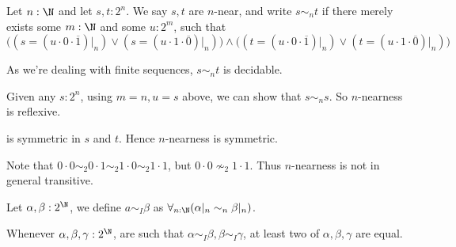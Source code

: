 \begin{definition}
  Let $n:\N$ and let $s,t : 2^n$. 
  We say $s,t$ are $n$-near, and write $s\sim_n t$ if 
  there merely exists some $m:\N$ and some $u:2^m$, such that 
 \begin{equation}\label{EqnNearness}
   \big(
     (s = (u\cdot 0\cdot \overline 1)|_n) \vee (s = (u \cdot 1 \cdot \overline 0) |_n)
   \big)
    \wedge 
   \big(
     (t = (u\cdot 0\cdot \overline 1)|_n) \vee (t = (u \cdot 1 \cdot \overline 0) |_n)
   \big)
  \end{equation} 
\end{definition}
\begin{remark}\label{nearnessProperties}
\item As we're dealing with finite sequences, $s\sim_n t$ is decidable. 
\item Given any $s:2^n$, using $m=n, u = s$ above, we can show that $s\sim_n s$. 
  So $n$-nearness is reflexive. 
\item {} is symmetric in $s$ and $t$. Hence $n$-nearness is symmetric.
\item Note that $0\cdot 0\sim_2 0\cdot 1 \sim_2 1\cdot 0 \sim_2 1\cdot 1$, 
  but $0\cdot 0\nsim_2 1\cdot 1$. %
  Thus $n$-nearness is not in general transitive. 
\end{remark}
\begin{definition}
  Let $\alpha, \beta: 2^\N$, we define $a\sim_I\beta$ as 
  $\forall_{n:\N} (\alpha|_n \sim_n \beta|_n)$. 
\end{definition}
\begin{lemma}\label{IntervalFiberSizeAtMost2}
  Whenever $\alpha,\beta,\gamma:2^\N$, are such that 
  $\alpha\sim_I \beta, \beta\sim_I \gamma$, 
  at least two of $\alpha,\beta,\gamma$ are equal. 
\end{lemma}
